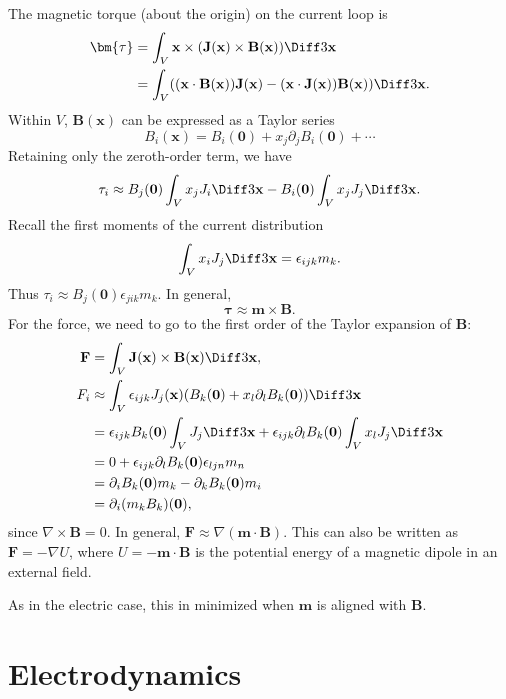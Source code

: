 \documentclass[12pt]{article}
\begin{document}
The magnetic torque (about the origin) on the current loop is
\begin{align*}
	\bm{\tau} &= \int_{V} \mathbf{x} \times (\mathbf{J} (\mathbf{x}) \times \mathbf{B}(\mathbf{x})) \Diff3 \mathbf{x} \\
		  &= \int_{V}((\mathbf{x} \cdot \mathbf{B}(\mathbf{x})) \mathbf{J}(\mathbf{x}) - (\mathbf{x} \cdot \mathbf{J}(\mathbf{x}))\mathbf{B}(\mathbf{x})) \Diff3 \mathbf{x}.
\end{align*}
Within $V$, $\mathbf{B}(\mathbf{x})$ can be expressed as a Taylor series
\[
B_i(\mathbf{x})= B_i(\mathbf{0}) + x_j \partial_j B_i(\mathbf{0}) + \cdots
\]
Retaining only the zeroth-order term, we have
\[
\tau_i \approx B_j(\mathbf{0}) \int_{V} x_j J_i \Diff3 \mathbf{x} - B_i(\mathbf{0}) \int_{V} x_j J_j \Diff3 \mathbf{x}
.\]
Recall the first moments of the current distribution
\[
\int_{V} x_i J_j \Diff3 \mathbf{x} = \epsilon_{ijk} m_k
.\]
Thus $\tau_i \approx B_j(\mathbf{0}) \epsilon_{jik}m_k$. In general,
\[
\bm{\tau} \approx \mathbf{m} \times \mathbf{B}
.\]
For the force, we need to go to the first order of the Taylor expansion of $\mathbf{B}$:
\begin{align*}
	\mathbf{F} &= \int_{V} \mathbf{J}(\mathbf{x}) \times \mathbf{B}(\mathbf{x}) \Diff3 \mathbf{x}, \\
	F_i &\approx \int_{V} \epsilon_{ijk} J_j(\mathbf{x}) (B_k(\mathbf{0}) + x_l \partial_l B_k(\mathbf{0})) \Diff3 \mathbf{x} \\
	    &= \epsilon_{ijk} B_k(\mathbf{0}) \int_{V} J_j \Diff3 \mathbf{x} + \epsilon_{ijk} \partial_l B_k(\mathbf{0}) \int_{V} x_l J_j \Diff3 \mathbf{x} \\
	    &= 0 + \epsilon_{ijk} \partial_l B_k(\mathbf{0}) \epsilon_{ljn} m_n \\
	    &= \partial_i B_k(\mathbf{0}) m_k - \partial_k B_k(\mathbf{0}) m_i \\
	    &= \partial_i (m_k B_k) (\mathbf{0}),
\end{align*}
since $\nabla \times \mathbf{B} = 0$. In general, $\mathbf{F} \approx \nabla (\mathbf{m} \cdot \mathbf{B})$. This can also be written as $\mathbf{F} = - \nabla U$, where $U = - \mathbf{m} \cdot \mathbf{B}$ is the potential energy of a magnetic dipole in an external field.

As in the electric case, this in minimized when $\mathbf{m}$ is aligned with $\mathbf{B}$.

\newpage

\section{Electrodynamics}
\label{sec:electrodynamics}
\end{document}
